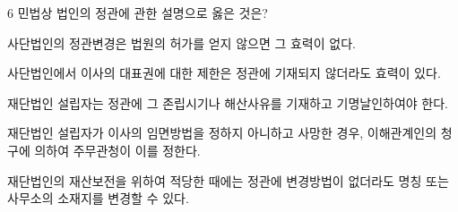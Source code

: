 \begin{question}{6}
민법상 법인의 정관에 관한 설명으로 옳은 것은?
\begin{choices}
  \item 사단법인의 정관변경은 법원의 허가를 얻지 않으면 그 효력이 없다.
  \item 사단법인에서 이사의 대표권에 대한 제한은 정관에 기재되지 않더라도 효력이 있다.
  \item 재단법인 설립자는 정관에 그 존립시기나 해산사유를 기재하고 기명날인하여야 한다.
  \item 재단법인 설립자가 이사의 임면방법을 정하지 아니하고 사망한 경우, 이해관계인의 청구에 의하여 주무관청이 이를 정한다.
  \item 재단법인의 재산보전을 위하여 적당한 때에는 정관에 변경방법이 없더라도 명칭 또는 사무소의 소재지를 변경할 수 있다.
\end{choices}
\end{question}

